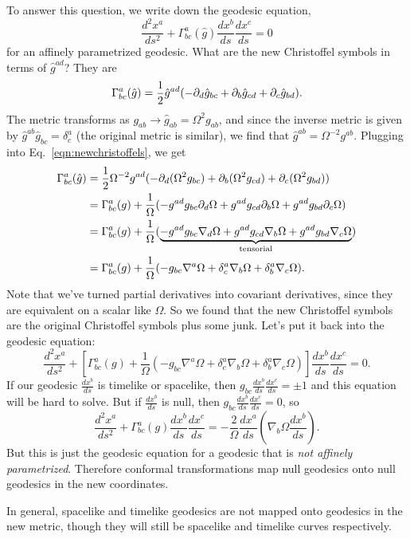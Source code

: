To answer this question, we write down the geodesic equation,
\begin{equation}
    \frac{d^2x^a}{ds^2}+\Gamma^a_{bc}(\hat g) \frac{dx^b}{ds}\frac{dx^c}{ds}=0
\end{equation}
for an affinely parametrized geodesic. What are the new Christoffel symbols in terms of $\hat g^{ad}$? They are
\begin{equation}\label{eqn:newchristoffels}
    \Gamma^a_{bc}(\hat g)=\frac{1}{2} \hat g^{ad}(-\partial_d \hat g_{bc}+\partial_b \hat g_{cd}+\partial_c \hat g_{bd}).
\end{equation}
The metric transforms as $g_{ab}\to \hat g_{ab}=\Omega^2 g_{ab}$, and since the inverse metric is given by $\hat g^{ab}\hat g_{bc}=\delta^a_c$ (the original metric is similar), we find that $\hat g^{ab}=\Omega^{-2} g^{ab}.$ Plugging into Eq.~\eqref{eqn:newchristoffels}, we get
\begin{align*}
    \Gamma^a_{bc}(\hat g)&=\frac{1}{2} \Omega^{-2} g^{ad}(-\partial_d(\Omega^2 g_{bc})+\partial_b(\Omega^2 g_{cd})+\partial_c(\Omega^2 g_{bd}))\\
        &=\Gamma^a_{bc}(g)+\frac{1}{\Omega}(-g^{ad}g_{bc} \partial_d \Omega + g^{ad}g_{cd} \partial_b \Omega + g^{ad} g_{bd}\partial_c \Omega)\\
        &=\Gamma^a_{bc}(g)+\frac{1}{\Omega}(\underbrace{-g^{ad}g_{bc} \nabla_d \Omega + g^{ad}g_{cd} \nabla_b \Omega + g^{ad} g_{bd}\nabla_c \Omega}_{\text{tensorial}})\\
        &=\Gamma^a_{bc}(g)+\frac{1}{\Omega}(-g_{bc}\nabla^a \Omega +\delta^a_c \nabla_b \Omega +\delta^a_b \nabla_c \Omega).
\end{align*}
Note that we've turned partial derivatives into covariant derivatives, since they are equivalent on a scalar like $\Omega$. So we found that the new Christoffel symbols are the original Christoffel symbols plus some junk. Let's put it back into the geodesic equation:
\begin{equation}
    \frac{d^2x^a}{ds^2}+\left[\Gamma^a_{bc}(g)+\frac{1}{\Omega}(-g_{bc}\nabla^a \Omega +\delta^a_c \nabla_b \Omega +\delta^a_b \nabla_c \Omega)\right]\frac{dx^b}{ds}\frac{dx^c}{ds}=0.
\end{equation}
If our geodesic $\frac{dx^b}{ds}$ is timelike or spacelike, then $g_{bc}\frac{dx^b}{ds}\frac{dx^c}{ds}=\pm 1$ and this equation will be hard to solve. But if $\frac{dx^b}{ds}$ is null, then $g_{bc}\frac{dx^b}{ds}\frac{dx^c}{ds}=0$, so
\begin{equation}
    \frac{d^2x^a}{ds^2}+\Gamma^a_{bc}(g)\frac{dx^b}{ds}\frac{dx^c}{ds}=-\frac{2}{\Omega}\frac{dx^a}{ds}\left(\nabla_b \Omega \frac{dx^b}{ds}\right).
\end{equation}
But this is just the geodesic equation for a geodesic that is \emph{not affinely parametrized}. Therefore conformal transformations map null geodesics onto null geodesics in the new coordinates.

In general, spacelike and timelike geodesics are not mapped onto geodesics in the new metric, though they will still be spacelike and timelike curves respectively.